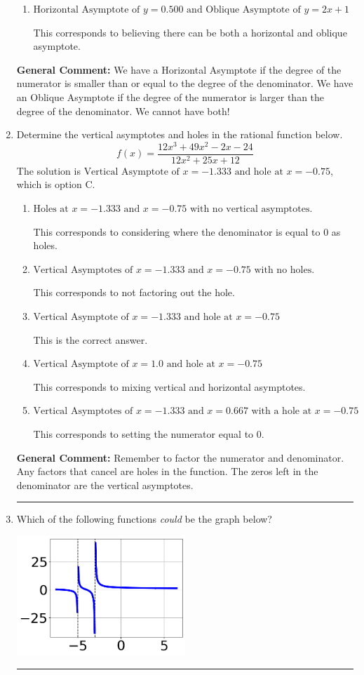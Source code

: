 \documentclass{extbook}[14pt]
\newcommand{\litem}[1]{\item #1

\rule{\textwidth}{0.4pt}}
\begin{document}
\begin{enumerate}
{\begin{enumerate}[label=\Alph*.]
* This is the correct option.
\item \( \text{Horizontal Asymptote of } y = 0.500 \text{ and Oblique Asymptote of } y = 2x + 1 \)

This corresponds to believing there can be both a horizontal and oblique asymptote.
\end{enumerate}

\textbf{General Comment:} We have a Horizontal Asymptote if the degree of the numerator is smaller than or equal to the degree of the denominator. We have an Oblique Asymptote if the degree of the numerator is larger than the degree of the denominator. We cannot have both!
}
\litem{
Determine the vertical asymptotes and holes in the rational function below.
\[ f(x) = \frac{12x^{3} +49 x^{2} -2 x -24}{12x^{2} +25 x + 12} \]The solution is \( \text{Vertical Asymptote of } x = -1.333 \text{ and hole at } x = -0.75 \), which is option C.\begin{enumerate}[label=\Alph*.]
\item \( \text{Holes at } x = -1.333 \text{ and } x = -0.75 \text{ with no vertical asymptotes.} \)

This corresponds to considering where the denominator is equal to 0 as holes.
\item \( \text{Vertical Asymptotes of } x = -1.333 \text{ and } x = -0.75 \text{ with no holes.} \)

This corresponds to not factoring out the hole.
\item \( \text{Vertical Asymptote of } x = -1.333 \text{ and hole at } x = -0.75 \)

This is the correct answer.
\item \( \text{Vertical Asymptote of } x = 1.0 \text{ and hole at } x = -0.75 \)

This corresponds to mixing vertical and horizontal asymptotes.
\item \( \text{Vertical Asymptotes of } x = -1.333 \text{ and } x = 0.667 \text{ with a hole at } x = -0.75 \)

This corresponds to setting the numerator equal to 0.
\end{enumerate}

\textbf{General Comment:} Remember to factor the numerator and denominator. Any factors that cancel are holes in the function. The zeros left in the denominator are the vertical asymptotes.
}
\litem{
Which of the following functions \textit{could} be the graph below?

\begin{center}
    \includegraphics[width=0.5\textwidth]{../Figures/identifyGraphOfRationalFunctionCopyB.png}
\end{center}


}
\end{enumerate}
\end{document}

